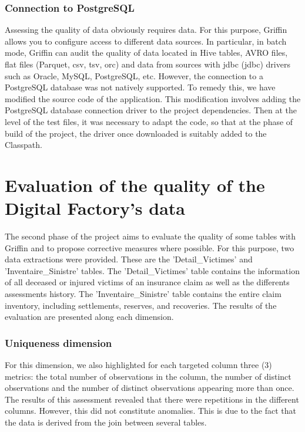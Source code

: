 \subsubsection{Connection to PostgreSQL}
Assessing the quality of data obviously requires data. For this purpose, Griffin allows you to configure access to different data sources. In particular, in batch mode, Griffin can audit the quality of data located in Hive tables, AVRO files, flat files (Parquet, \acrfull{csv}, \acrfull{tsv}, \acrfull{orc}) and data from sources with \acrshort{jdbc} (\acrlong{jdbc}) drivers such as Oracle, MySQL, PostgreSQL, etc. However, the connection to a PostgreSQL database was not natively supported.  To remedy this, we have modified the source code of the application. This modification involves adding the PostgreSQL database connection driver to the project dependencies. Then at the level of the test files, it was necessary to adapt the code, so that at the phase of build of the project, the driver once downloaded is suitably added to the Classpath. 

\section{Evaluation of the quality of the Digital Factory's data}
The second phase of the project aims to evaluate the quality of some tables with Griffin and to propose corrective measures where possible. For this purpose, two data extractions were provided. These are the 'Detail\_Victimes' and 'Inventaire\_Sinistre' tables. The 'Detail\_Victimes' table contains the information of all deceased or injured victims of an insurance claim as well as the differents assessments history. The 'Inventaire\_Sinistre' table contains the entire claim inventory, including settlements, reserves, and recoveries. The results of the evaluation are presented along each dimension.

\subsubsection{Uniqueness dimension}
For this dimension, we also highlighted for each targeted column three (3) metrics: the total number of observations in the column, the number of distinct observations and the number of distinct observations appearing more than once. The results of this assessment revealed that there were repetitions in the different columns. However, this did not constitute anomalies. This is due to the fact that the data is derived from the join between several tables.

